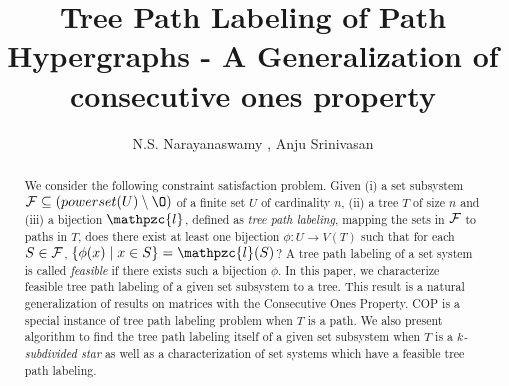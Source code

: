\documentclass{fsttcs}
\def\cF{{\cal F}}
\def\F{{\mathcal F}}
\def\cl{\mathpzc{l}}
\newcommand{\rcomment}[1]{}
\begin{document}



\title{Tree Path Labeling of Path Hypergraphs - A Generalization of
  consecutive ones property}


\author{N.S. Narayanaswamy , Anju Srinivasan }




\begin{abstract}
  \rcomment{Need to overhaul the abstract}
  We consider the following constraint satisfaction problem. Given (i)
  a
  set subsystem $\F \subseteq (powerset(U) \setminus \O)$ of a finite
  set $U$ of cardinality $n$, (ii) a tree 
  $T$ of size $n$ and (iii) a bijection $\cl$, defined as {\em tree
    path labeling}, mapping the sets in $\cF$ to 
  paths in $T$, does there exist at least one bijection 
  $\phi:U \rightarrow 
   V(T)$ such that for each $S \in \cF$, $\{\phi(x) \mid x \in S\} =
   \cl(S)$?  A tree path labeling of a set system is called {\em
     feasible} if there exists such 
  a bijection $\phi$.  In this paper, we characterize feasible tree
  path labeling of a given set subsystem to a tree.  This result is a
  natural generalization of results on matrices with the Consecutive
  Ones Property. COP is a special instance of tree path labeling
  problem when $T$ is a path.  We also
  present algorithm to find the tree path labeling itself of a given
  set subsystem when $T$ is a {\em $k$-subdivided star} as well as a
  characterization of set systems which have a 
  feasible tree path labeling. 
\end{abstract}
\end{document}
